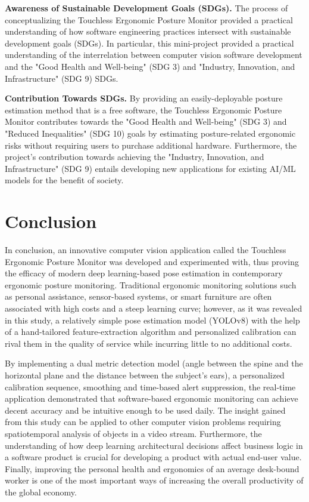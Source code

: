 \documentclass{llncs}
\begin{document}
\noindent\textbf{Awareness of Sustainable Development Goals (SDGs).}
The process of conceptualizing the Touchless Ergonomic Posture Monitor provided a practical understanding of how software engineering practices intersect with sustainable development goals (SDGs). In particular, this mini-project provided a practical understanding of the interrelation between computer vision software development and the "Good Health and Well-being" (SDG 3) and "Industry, Innovation, and Infrastructure" (SDG 9) SDGs.

\noindent\textbf{Contribution Towards SDGs.}
By providing an easily-deployable posture estimation method that is a free software, the Touchless Ergonomic Posture Monitor contributes towards the "Good Health and Well-being" (SDG 3) and "Reduced Inequalities" (SDG 10) goals by estimating posture-related ergonomic risks without requiring users to purchase additional hardware. Furthermore, the project's contribution towards achieving the "Industry, Innovation, and Infrastructure" (SDG 9) entails developing new applications for existing AI/ML models for the benefit of society.

\section{Conclusion}
In conclusion, an innovative computer vision application called the Touchless Ergonomic Posture Monitor was developed and experimented with, thus proving the efficacy of modern deep learning-based pose estimation in contemporary ergonomic posture monitoring. Traditional ergonomic monitoring solutions such as personal assistance, sensor-based systems, or smart furniture are often associated with high costs and a steep learning curve; however, as it was revealed in this study, a relatively simple pose estimation model (YOLOv8) with the help of a hand-tailored feature-extraction algorithm and personalized calibration can rival them in the quality of service while incurring little to no additional costs.

By implementing a dual metric detection model (angle between the spine and the horizontal plane and the distance between the subject's ears), a personalized calibration sequence, smoothing and time-based alert suppression, the real-time application demonstrated that software-based ergonomic monitoring can achieve decent accuracy and be intuitive enough to be used daily. The insight gained from this study can be applied to other computer vision problems requiring spatiotemporal analysis of objects in a video stream. Furthermore, the understanding of how deep learning architectural decisions affect business logic in a software product is crucial for developing a product with actual end-user value. Finally, improving the personal health and ergonomics of an average desk-bound worker is one of the most important ways of increasing the overall productivity of the global economy.
\end{document}
